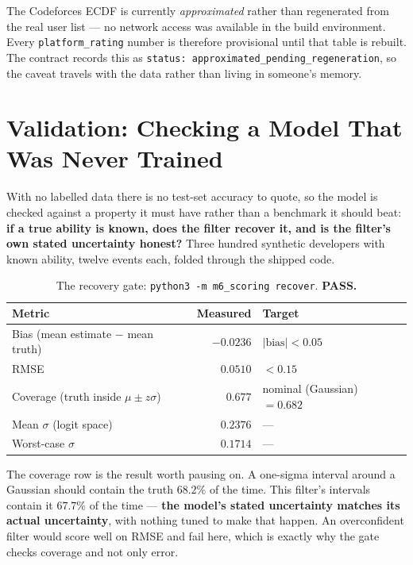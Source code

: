 \documentclass[11pt,a4paper]{article}
\newenvironment{notebox}[1]{%
  \def\FrameCommand{{\color{warn}\vrule width 2.4pt}\hspace{9pt}}%
  \MakeFramed{\advance\hsize-\width \FrameRestore}%
  \noindent{\sffamily\footnotesize\bfseries\color{warn}#1}\par\smallskip
  \small
}{%
  \par\endMakeFramed
}
\begin{document}
\begin{notebox}{Known limitation, stated up front}
The Codeforces ECDF is currently \emph{approximated} rather than
regenerated from the real user list --- no network access was available in
the build environment. Every \texttt{platform\_rating} number is therefore
provisional until that table is rebuilt. The contract records this as
\texttt{status: approximated\_pending\_regeneration}, so the caveat travels
with the data rather than living in someone's memory.
\end{notebox}

\section{Validation: Checking a Model That Was Never Trained}

With no labelled data there is no test-set accuracy to quote, so the model
is checked against a property it must have rather than a benchmark it
should beat: \textbf{if a true ability is known, does the filter recover
it, and is the filter's own stated uncertainty honest?} Three hundred
synthetic developers with known ability, twelve events each, folded through
the shipped code.

\begin{table}[H]
\centering\small
\begin{tabular}{@{}lrl@{}}
\toprule
\textbf{Metric} & \textbf{Measured} & \textbf{Target} \\
\midrule
Bias (mean estimate $-$ mean truth) & $-0.0236$ & $|\text{bias}| < 0.05$ \\
RMSE                                & $0.0510$  & $< 0.15$ \\
Coverage (truth inside $\mu\pm z\sigma$) & $0.677$ & nominal (Gaussian) $= 0.682$ \\
Mean $\sigma$ (logit space)         & $0.2376$  & --- \\
Worst-case $\sigma$                 & $0.1714$  & --- \\
\bottomrule
\end{tabular}
\caption{The recovery gate: \texttt{python3 -m m6\_scoring recover}. \textbf{PASS.}}
\end{table}

The coverage row is the result worth pausing on. A one-sigma interval
around a Gaussian should contain the truth $68.2\%$ of the time. This
filter's intervals contain it $67.7\%$ of the time --- \textbf{the model's
stated uncertainty matches its actual uncertainty}, with nothing tuned to
make that happen. An overconfident filter would score well on RMSE and fail
here, which is exactly why the gate checks coverage and not only error.
\end{document}
